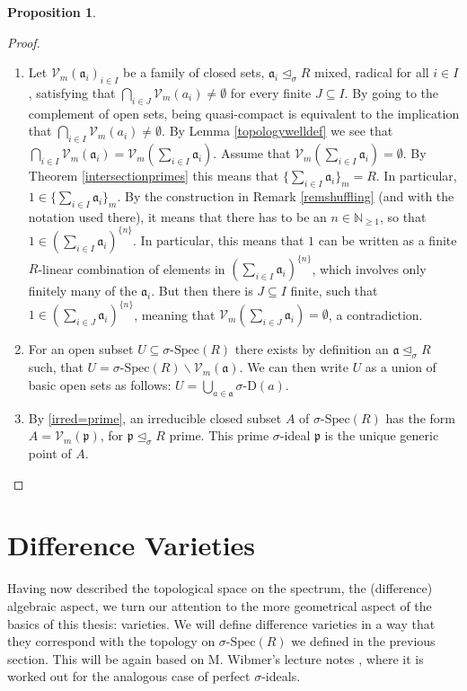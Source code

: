 \documentclass{article}
\def\NE{\mathbb{N}_{\geq1}}
\def\Vm{\mathcal{V}_m}
\def\a{\mathfrak{a}}
\def\p{\mathfrak{p}}
\def\s{\sigma}
\def\si{\unlhd_{\sigma}}
\def\sSpec{\sigma\text{-Spec}}
\newenvironment{bew}{\begin{proof}[Proof]}{\end{proof}}
\theoremstyle{definition}
\newtheorem{prop}[Satz]{Proposition}
\begin{document}
\begin{prop}
\begin{bew}
\begin{enumerate}
\item Let $\Vm(\a_i)_{i \in I}$ be a family of closed sets, $\a_i \si R$ mixed, radical for all $i \in I$, satisfying that 
$\bigcap_{i \in J} \Vm( a_i) \neq \emptyset$ for every finite $J \subseteq I$. By  going to the complement of open sets, being quasi-compact is equivalent to the implication that $\bigcap_{i \in I} \Vm(a_i) \neq \emptyset$.
By Lemma \ref{topologywelldef} we see that $\bigcap_{i \in I} \Vm( \a_i) = \Vm ( \sum_{i \in I} \a_i)$. Assume that $ \Vm ( \sum_{i \in I} \a_i) = \emptyset$. 
By Theorem \ref{intersectionprimes} this means that $\{ \sum_{i \in I} \a_i \}_m = R$. In particular, $1 \in \{ \sum_{i \in I} \a_i \}_m$. By the construction in Remark \ref{remshuffling} (and with the notation used there), it means that there has to be an $n \in \NE$,
so that $1 \in (\sum_{i \in I} \a_i )^{\{n\}}$. In particular, this means that $1$ can be written as a finite $R$-linear combination of elements in $(\sum_{i \in I} \a_i )^{\{n\}}$, which involves only finitely many of the $\a_i$.
But then there is $J \subseteq I$ finite, such that $1 \in (\sum_{i \in J} \a_i)^{\{n\}}$, meaning that $\Vm(\sum_{i \in J} \a_i) = \emptyset$, a contradiction. 
\item For an open subset $U \subseteq \sSpec(R)$ there exists by definition an $\a \si R$ such, that $U = \sSpec(R) \backslash \Vm(\a)$. We can then write $U$ as a union of basic open sets as follows: $U = \bigcup_{a \in \a} \s$-D$(a)$.
\item By \ref{irred=prime}, an irreducible closed subset $A$ of $\sSpec(R)$ has the form $A = \Vm(\p)$, for $\p \si R$ prime. This prime $\s$-ideal $\p$ is the unique generic point of $A$.
\end{enumerate}
\end{bew}
\end{prop}

\clearpage
\section{Difference Varieties}


Having now described the topological space on the spectrum, the (difference) algebraic aspect, we turn our attention to the more geometrical aspect of the basics of this thesis: varieties.
We will define difference varieties in a way that they correspond with the topology on $\sSpec(R)$ we defined in the previous section. This will be again based on M. Wibmer's lecture notes \cite{wibmer}, 
where it is worked out for the analogous case of perfect $\s$-ideals.
\end{document}
